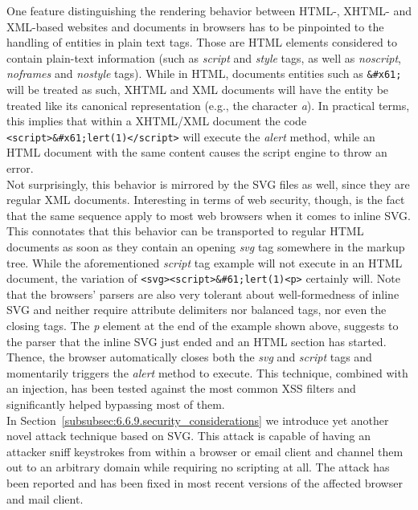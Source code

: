     One feature distinguishing the rendering behavior between HTML-, XHTML- and XML-based websites and documents in browsers has to be pinpointed to the handling of entities in plain text tags. Those are HTML elements considered to contain plain-text information (such as \textit{script} and \textit{style} tags, as well as \textit{noscript}, \textit{noframes} and \textit{nostyle} tags). While in HTML, documents entities such as \texttt{\&\#x61;} will be treated as such, XHTML and XML documents will have the entity be treated like its canonical representation (e.g., the character \textit{a}). In practical terms, this implies that within a XHTML/XML document the code \texttt{<script>\&\#x61;lert(1)</script>} will execute the \textit{alert} method, while an HTML document with the same content causes the script engine to throw an error.\\

    Not surprisingly, this behavior is mirrored by the SVG files as well, since they are regular XML documents. Interesting in terms of web security, though, is the fact that the same sequence apply to most web browsers when it comes to inline SVG. This connotates that this behavior can be transported to regular HTML documents as soon as they contain an opening \textit{svg} tag somewhere in the markup tree. While the aforementioned \textit{script} tag example will not execute in an HTML document, the variation of \texttt{<svg><script>\&\#61;lert(1)<p>} certainly will. Note that the browsers' parsers are also very tolerant about well-formedness of inline SVG and neither require attribute delimiters nor balanced tags, nor even the closing tags. 
    The \textit{p} element at the end of the example shown above, suggests to the parser that the inline SVG just ended and an HTML section has started. Thence, the browser automatically closes both the \textit{svg} and \textit{script} tags and momentarily triggers the \textit{alert} method to execute. This technique, combined with an injection, has been tested against the most common XSS filters and significantly helped bypassing most of them. \\

    In Section~\ref{subsubsec:6.6.9.security_considerations} we introduce yet another novel attack technique based on SVG. This attack is capable of having an attacker sniff keystrokes from within a browser or email client and channel them out to an arbitrary domain while requiring no scripting at all. The attack has been reported and has been fixed in most recent versions of the affected browser and mail client.

